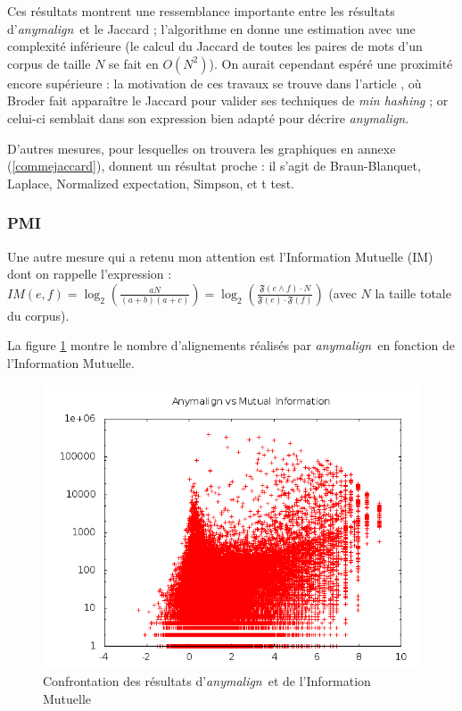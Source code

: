 \documentclass[a4paper,10pt]{article}
\newcommand{\anym}{\emph{anymalign}}
\begin{document}
Ces résultats montrent une ressemblance importante entre les résultats d'\anym~et le Jaccard ; l'algorithme en donne une estimation avec une complexité inférieure (le calcul du Jaccard de toutes les paires de mots d'un corpus de taille $N$ se fait en $O(N^2)$).
On aurait cependant espéré une proximité encore supérieure : la motivation de ces travaux se trouve dans l'article \cite{broder2000identifying}, où Broder fait apparaître le Jaccard pour valider ses techniques de \emph{min hashing} ; or celui-ci semblait dans son expression bien adapté pour décrire \anym.

D'autres mesures, pour lesquelles on trouvera les graphiques en annexe (\ref{commejaccard}), donnent un résultat proche : il s'agit de Braun-Blanquet, Laplace, Normalized expectation, Simpson, et t test. 

\subsubsection{PMI}

Une autre mesure qui a retenu mon attention est l'Information Mutuelle (IM) %
 dont on rappelle l'expression : $IM(e,f)=\log_2\left(\frac{aN}{(a+b)(a+c)}\right)=\log_2\left(\frac{\mathfrak{F}(e\wedge f)\cdot N}{\mathfrak{F}(e)\cdot\mathfrak{F}(f)}\right)$ (avec $N$ la taille totale du corpus).

La figure \ref{im} montre le nombre d'alignements %
 réalisés par \anym~en fonction de l'Information Mutuelle.

\begin{figure}[t]
\centering
\includegraphics[width=12cm]{imlog.png} %
\caption{Confrontation des résultats d'\anym~et de l'Information Mutuelle}
\label{im}
\end{figure}
\end{document}
